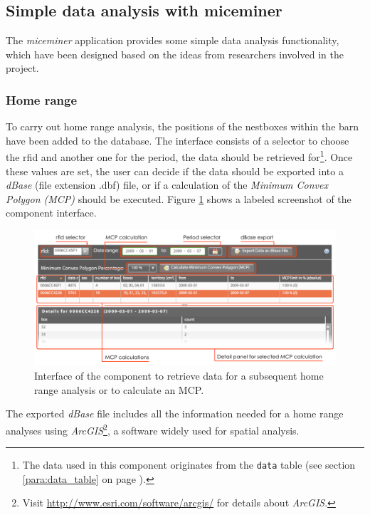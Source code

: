 \subsection{Simple data analysis with miceminer}
\label{subsec:data_ana} 

The \textit{miceminer} application provides some simple data analysis functionality, which have been designed based on the ideas from researchers involved in the project.

\subsubsection{Home range}
\label{subsubsec:homerangedata}

To carry out home range analysis, the positions of the nestboxes within the barn have been added to the database. The interface consists of a selector to choose the rfid and another one for the period, the data should be retrieved for\footnote{The data used in this component originates from the \lstinline|data| table (see section \ref{para:data_table} on page \pageref{para:data_table}).}. Once these values are set, the user can decide if the data should be exported into a \textit{dBase} (file extension .dbf) file, or if a calculation of the \textit{Minimum Convex Polygon (MCP)} should be executed. Figure \ref{fig:home_range} shows a labeled screenshot of the component interface.

\begin{figure}[htpb]
\begin{center}
  \includegraphics[width=.75\textwidth]{assets/pdf/home_range.pdf}
  \caption[Home range component interface]{Interface of the component to retrieve data for a subsequent home range analysis or to calculate an MCP.}
  \label{fig:home_range}
\end{center}
\end{figure}

The exported \textit{dBase} file includes all the information needed for a home range analyses using \textit{ArcGIS}\footnote{Visit \href{http://www.esri.com/software/arcgis/}{http://www.esri.com/software/arcgis/} for details about \textit{ArcGIS}.}, a software widely used for spatial analysis. 

